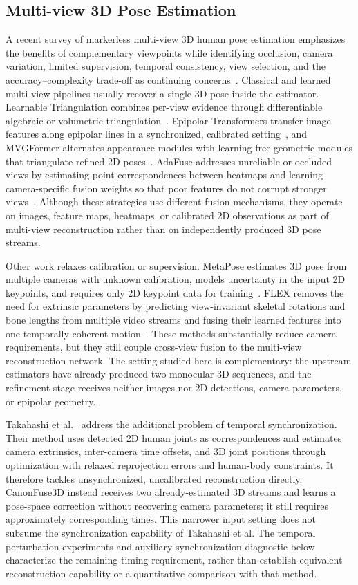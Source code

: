 \documentclass[preprint,12pt]{elsarticle}
\begin{document}
\subsection{Multi-view 3D Pose Estimation}
A recent survey of markerless multi-view 3D human pose estimation emphasizes the benefits of complementary viewpoints while identifying occlusion, camera variation, limited supervision, temporal consistency, view selection, and the accuracy--complexity trade-off as continuing concerns~\cite{nogueira2025survey}. Classical and learned multi-view pipelines usually recover a single 3D pose inside the estimator. Learnable Triangulation combines per-view evidence through differentiable algebraic or volumetric triangulation~\cite{iskakov2019learnable}. Epipolar Transformers transfer image features along epipolar lines in a synchronized, calibrated setting~\cite{he2020epipolar}, and MVGFormer alternates appearance modules with learning-free geometric modules that triangulate refined 2D poses~\cite{liao2024multiple}. AdaFuse addresses unreliable or occluded views by estimating point correspondences between heatmaps and learning camera-specific fusion weights so that poor features do not corrupt stronger views~\cite{zhang2021adafuse}. Although these strategies use different fusion mechanisms, they operate on images, feature maps, heatmaps, or calibrated 2D observations as part of multi-view reconstruction rather than on independently produced 3D pose streams.

Other work relaxes calibration or supervision. MetaPose estimates 3D pose from multiple cameras with unknown calibration, models uncertainty in the input 2D keypoints, and requires only 2D keypoint data for training~\cite{usman2022metapose}. FLEX removes the need for extrinsic parameters by predicting view-invariant skeletal rotations and bone lengths from multiple video streams and fusing their learned features into one temporally coherent motion~\cite{gordon2022flex}. These methods substantially reduce camera requirements, but they still couple cross-view fusion to the multi-view reconstruction network. The setting studied here is complementary: the upstream estimators have already produced two monocular 3D sequences, and the refinement stage receives neither images nor 2D detections, camera parameters, or epipolar geometry.

Takahashi et al.~\cite{takahashi2018human} address the additional problem of temporal synchronization. Their method uses detected 2D human joints as correspondences and estimates camera extrinsics, inter-camera time offsets, and 3D joint positions through optimization with relaxed reprojection errors and human-body constraints. It therefore tackles unsynchronized, uncalibrated reconstruction directly. CanonFuse3D instead receives two already-estimated 3D streams and learns a pose-space correction without recovering camera parameters; it still requires approximately corresponding times. This narrower input setting does not subsume the synchronization capability of Takahashi et al. The temporal perturbation experiments and auxiliary synchronization diagnostic below characterize the remaining timing requirement, rather than establish equivalent reconstruction capability or a quantitative comparison with that method.
\end{document}
